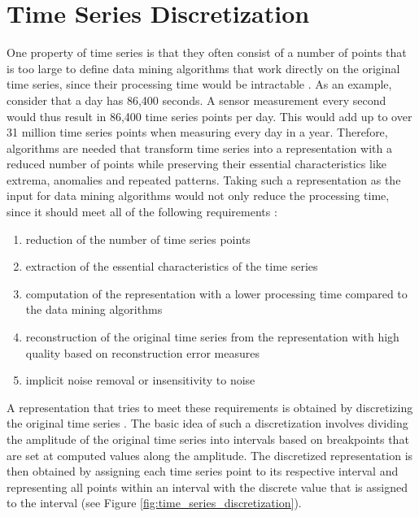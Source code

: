 \chapter{Time Series Discretization} \label{chap:ts_discretization}
One property of time series is that they often consist of a number of points that is too large to define data mining algorithms that work directly on the original time series, since their processing time would be intractable \cite{Survey_Esling}. As an example, consider that a day has 86,400 seconds. A sensor measurement every second would thus result in 86,400 time series points per day. This would add up to over 31 million time series points when measuring every day in a year. \newline
Therefore, algorithms are needed that transform time series into a representation with a reduced number of points while preserving their essential characteristics like extrema, anomalies and repeated patterns. Taking such a representation as the input for data mining algorithms would not only reduce the processing time, since it should meet all of the following requirements \cite{Survey_Esling}:
\vspace{-3pt}
\begin{enumerate}[itemsep=-10pt]
\item reduction of the number of time series points
\item extraction of the essential characteristics of the time series
\item computation of the representation with a lower processing time compared to the data mining algorithms
\item reconstruction of the original time series from the representation with high quality based on reconstruction error measures
\item implicit noise removal or insensitivity to noise
\end{enumerate}
\vspace{-3pt}
A representation that tries to meet these requirements is obtained by discretizing the original time series \cite{Survey_Temporal_Discretization}. The basic idea of such a discretization involves dividing the amplitude of the original time series into intervals based on breakpoints that are set at computed values along the amplitude. The discretized representation is then obtained by assigning each time series point to its respective interval and representing all points within an interval with the discrete value that is assigned to the interval (see Figure \ref{fig:time_series_discretization}).
